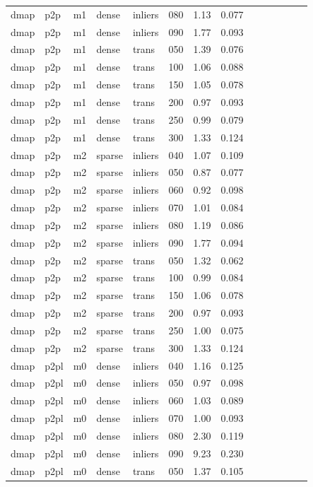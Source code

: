 \begin{table}[htbp]
\begin{tabular}{llllllrrrrrrrr}
  dmap & p2p & m1 & dense & inliers & 080 & 1.13 & 0.077 \\
  dmap & p2p & m1 & dense & inliers & 090 & 1.77 & 0.093 \\
  dmap & p2p & m1 & dense & trans & 050 & 1.39 & 0.076 \\
  dmap & p2p & m1 & dense & trans & 100 & 1.06 & 0.088 \\
  dmap & p2p & m1 & dense & trans & 150 & 1.05 & 0.078 \\
  dmap & p2p & m1 & dense & trans & 200 & 0.97 & 0.093 \\
  dmap & p2p & m1 & dense & trans & 250 & 0.99 & 0.079 \\
  dmap & p2p & m1 & dense & trans & 300 & 1.33 & 0.124 \\
  dmap & p2p & m2 & sparse & inliers & 040 & 1.07 & 0.109 \\
  dmap & p2p & m2 & sparse & inliers & 050 & 0.87 & 0.077 \\
  dmap & p2p & m2 & sparse & inliers & 060 & 0.92 & 0.098 \\
  dmap & p2p & m2 & sparse & inliers & 070 & 1.01 & 0.084 \\
  dmap & p2p & m2 & sparse & inliers & 080 & 1.19 & 0.086 \\
  dmap & p2p & m2 & sparse & inliers & 090 & 1.77 & 0.094 \\
  dmap & p2p & m2 & sparse & trans & 050 & 1.32 & 0.062 \\
  dmap & p2p & m2 & sparse & trans & 100 & 0.99 & 0.084 \\
  dmap & p2p & m2 & sparse & trans & 150 & 1.06 & 0.078 \\
  dmap & p2p & m2 & sparse & trans & 200 & 0.97 & 0.093 \\
  dmap & p2p & m2 & sparse & trans & 250 & 1.00 & 0.075 \\
  dmap & p2p & m2 & sparse & trans & 300 & 1.33 & 0.124 \\
  dmap & p2pl & m0 & dense & inliers & 040 & 1.16 & 0.125 \\
  dmap & p2pl & m0 & dense & inliers & 050 & 0.97 & 0.098 \\
  dmap & p2pl & m0 & dense & inliers & 060 & 1.03 & 0.089 \\
  dmap & p2pl & m0 & dense & inliers & 070 & 1.00 & 0.093 \\
  dmap & p2pl & m0 & dense & inliers & 080 & 2.30 & 0.119 \\
  dmap & p2pl & m0 & dense & inliers & 090 & 9.23 & 0.230 \\
  dmap & p2pl & m0 & dense & trans & 050 & 1.37 & 0.105 \\

\end{tabular}
\end{table}
